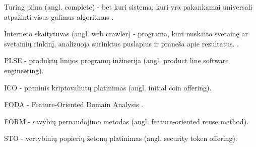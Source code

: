 \documentclass{VUMIFPSbakalaurinis}
\begin{document}

\printbibliography[heading=bibintoc]  %



Turing pilna (angl. complete) - bet kuri sistema, kuri yra pakankamai universali atpažinti visus galimus algoritmus \cite{Teller1994}.


Interneto skaitytuvas (angl. web crawler) -  programa, kuri nuskaito svetainę ar svetainių rinkinį, analizuoja surinktus puslapius ir praneša apie rezultatus. \cite{Thelwall2001}.



PLSE - produktų linijos programų inžinerija (angl. product line software engineering).

ICO - pirminis kriptovaliutų platinimas (angl. initial coin offering).

FODA - Feature-Oriented Domain Analysis \cite{Kang1990}.

FORM - savybių pernaudojimo metodas (angl. feature-oriented reuse method).

STO - vertybinių popierių žetonų platinimas (angl. security token offering).
\end{document}
